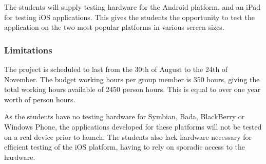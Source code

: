 The students will supply testing hardware for the Android platform, and an iPad
for testing iOS applications. This gives the students the opportunity to test
the application on the two most popular platforms in various screen sizes.

\subsubsection{Limitations}
The project is scheduled to last from the 30th of August to the 24th of
November. The budget working hours per group member is 350 hours, giving the
total working hours available of 2450 person hours. This is equal to over one
year worth of person hours.

As the students have no testing hardware for Symbian, Bada, BlackBerry or
Windows Phone, the applications developed for these platforms will not be
tested on a real device prior to launch. The students also lack hardware
necessary for efficient testing of the iOS platform, having to rely on sporadic
access to the hardware.


